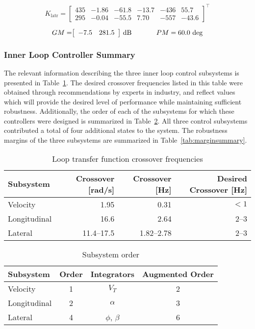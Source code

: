 \begin{equation*}
  K_{\text{latr}}=
  \left[
  \begin{array}{rrrrrr}
    435 & -1.86 & -61.8 & -13.7 & -436 & 55.7 \\
    295 & -0.04 & -55.5 & 7.70 & -557 & -43.6
  \end{array}\right]^{\top}
\end{equation*}

\begin{equation*}
  GM=
  \bigr[
  \begin{array}{cc}
    -7.5 & 281.5
  \end{array}\bigr]\text{~dB}
  \hspace{0.5in}
  PM=60.0\text{~deg}
\end{equation*}

\subsubsection*{Inner Loop Controller Summary}

The relevant information describing the three inner loop control subsystems is presented in Table~\ref{tab:crossovers}.
The desired crossover frequencies listed in this table were obtained through recommendations by experts in industry, and reflect values which will provide the desired level of performance while maintaining sufficient robustness.
Additionally, the order of each of the subsystems for which these controllers were designed is summarized in Table~\ref{tab:controlorders}.
All three control subsystems contributed a total of four additional states to the system.
The robustness margins of the three subsystems are summarized in Table~\ref{tab:marginsummary}.

\begin{table}[H]
  \centering
  \caption{Loop transfer function crossover frequencies}
  \small
  \begin{tabular}{lrrr}
    \toprule
    Subsystem & Crossover [rad/s] & Crossover [Hz] & Desired Crossover [Hz]\\
    \midrule
    Velocity & 1.95 & 0.31 & $<1$ \\
    Longitudinal & 16.6 & 2.64 & 2--3 \\
    Lateral & 11.4--17.5 & 1.82--2.78 & 2--3 \\
    \bottomrule
  \end{tabular}\label{tab:crossovers}
\end{table}

\begin{table}[H]
  \centering
  \caption{Subsystem order}
  \small
  \begin{tabular}{lccc}
    \toprule
    Subsystem & Order & Integrators & Augmented Order \\
    \midrule
    Velocity & 1 & $V_{T}$ & 2 \\
    Longitudinal & 2 & $\alpha$ & 3 \\
    Lateral & 4 & $\phi$, $\beta$ & 6 \\
    \bottomrule
  \end{tabular}\label{tab:controlorders}
\end{table}

